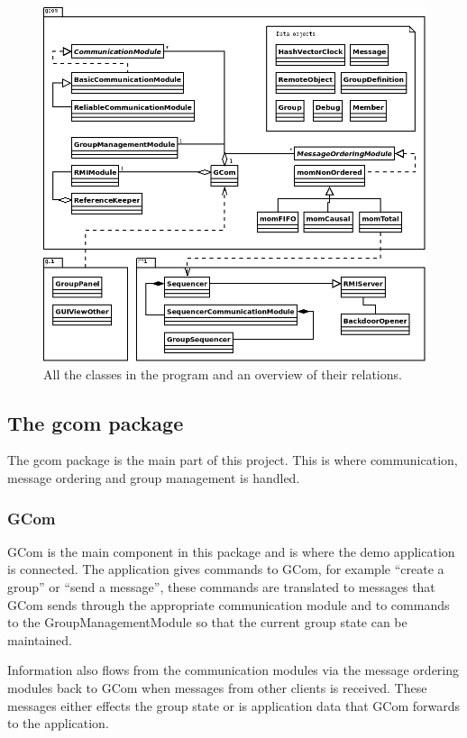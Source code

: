 \documentclass[english]{article}
\begin{document}
\begin{figure}
\includegraphics[width=\textwidth]{superuml.png}
\caption{All the classes in the program and an overview of their relations.}
\label{fig:overview}
\end{figure}

\subsection{The gcom package}
The gcom package is the main part of this project. This is where communication, message ordering and group management is handled. 

\subsubsection{GCom}
GCom is the main component in this package and is where the demo application is connected. The application gives commands to GCom, for example ``create a group'' or ``send a message'', these commands are translated to messages that GCom sends through the appropriate communication module and to commands to the GroupManagementModule so that the current group state can be maintained.

Information also flows from the communication modules via the message ordering modules back to GCom when messages from other clients is received. These messages either effects the group state or is application data that GCom forwards to the application. 
\end{document}
